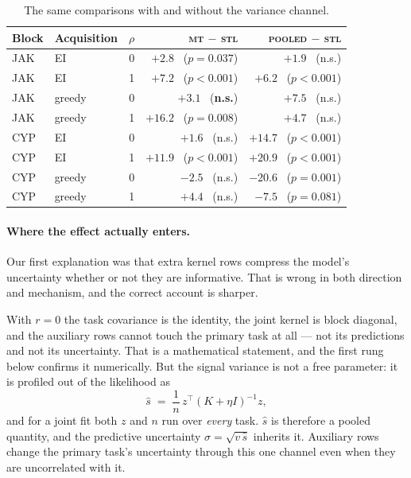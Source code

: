 \documentclass[11pt]{article}
\newcommand{\stl}{\textsc{stl}}
\newcommand{\mt}{\textsc{mt}}
\newcommand{\pooled}{\textsc{pooled}}
\begin{document}
\begin{table}[ht]
\centering\small
\begin{tabular}{llrrr}
\toprule
Block & Acquisition & $\rho$ & \mt{} $-$ \stl{} & \pooled{} $-$ \stl{} \\
\midrule
JAK & EI     & 0 & $+2.8$ \ ($p=0.037$) & $+1.9$ \ (n.s.) \\
JAK & EI     & 1 & $+7.2$ \ ($p<0.001$) & $+6.2$ \ ($p<0.001$) \\
JAK & greedy & 0 & $+3.1$ \ (\textbf{n.s.}) & $+7.5$ \ (n.s.) \\
JAK & greedy & 1 & $\mathbf{+16.2}$ \ ($p=0.008$) & $+4.7$ \ (n.s.) \\
\midrule
CYP & EI     & 0 & $+1.6$ \ (n.s.) & $\mathbf{+14.7}$ \ ($p<0.001$) \\
CYP & EI     & 1 & $+11.9$ \ ($p<0.001$) & $+20.9$ \ ($p<0.001$) \\
CYP & greedy & 0 & $-2.5$ \ (n.s.) & $\mathbf{-20.6}$ \ ($p=0.001$) \\
CYP & greedy & 1 & $+4.4$ \ (n.s.) & $\mathbf{-7.5}$ \ ($p=0.081$) \\
\bottomrule
\end{tabular}
\caption{The same comparisons with and without the variance channel.}
\label{tab:greedy}
\end{table}

\paragraph{Where the effect actually enters.} Our first explanation was that
extra kernel rows compress the model's uncertainty whether or not they are
informative. That is wrong in both direction and mechanism, and the correct
account is sharper.

With $r = 0$ the task covariance is the identity, the joint kernel is block
diagonal, and the auxiliary rows cannot touch the primary task at all --- not
its predictions and not its uncertainty. That is a mathematical statement, and
the first rung below confirms it numerically. But the signal variance is not a
free parameter: it is profiled out of the likelihood as
\[
  \hat{s} \;=\; \frac{1}{n}\,z^{\top}\!\left(K + \eta I\right)^{-1} z ,
\]
and for a joint fit both $z$ and $n$ run over \emph{every} task. $\hat{s}$ is
therefore a pooled quantity, and the predictive uncertainty
$\sigma = \sqrt{v\,\hat{s}}$ inherits it. Auxiliary rows change the primary
task's uncertainty through this one channel even when they are uncorrelated
with it.
\end{document}

